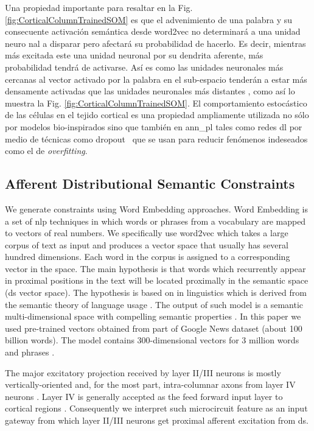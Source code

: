 {Una propiedad importante para resaltar en la Fig. \ref{fig:CorticalColumnTrainedSOM} es que el advenimiento de una palabra y su consecuente activación semántica desde word2vec no determinará a una unidad neuro nal a disparar pero afectará su probabilidad de hacerlo.
Es decir, mientras más excitada este una unidad neuronal por su dendrita aferente, más probabilidad tendrá de activarse.
Así es como las unidades neuronales más cercanas al vector activado por la palabra en el sub-espacio tenderán a estar más densamente activadas que las unidades neuronales más distantes , como así lo muestra la Fig. \ref{fig:CorticalColumnTrainedSOM}.
El comportamiento estocástico de las células en el tejido cortical es una propiedad ampliamente utilizada no sólo por modelos bio-inspirados \cite{harrison_l.m_stochastic_2005} sino que también en \gls{ann_pl} tales como redes \gls{dl} por medio de técnicas como dropout~\cite{Srivastava2014DropoutAS} que se usan para reducir fenómenos indeseados como el de \emph{overfitting}.
}{
\subsection{Afferent Distributional Semantic Constraints}

We generate  constraints using Word Embedding approaches. Word Embedding is a set of \gls{nlp} techniques in which words or phrases from a vocabulary are mapped to vectors of real numbers. We specifically use word2vec which takes a large corpus of text as input and produces a vector space that usually has several hundred dimensions. Each word in the corpus is assigned to a corresponding vector in the space. The main hypothesis is that words which recurrently appear in proximal positions in the text will be located proximally in the semantic space (\gls{ds} vector space).
The hypothesis is based on  in linguistics which is derived from the semantic theory of language usage \cite{doi:10.1080/00437956.1954.11659520}.
The output of such model is a semantic multi-dimensional space with compelling semantic properties \cite{mikolov2013linguistic, journals/corr/abs-1301-3781, Mikolov:2013:DRW:2999792.2999959}. In this paper we used pre-trained vectors obtained from part of Google News dataset (about 100 billion words). The model contains 300-dimensional vectors for 3 million words and phrases \cite{noauthor_google_nodate}.

The major excitatory projection received by layer II/III neurons is mostly vertically-oriented and, for the most part, intra-columnar axons
from layer IV neurons \cite{10.3389/neuro.01.1.1.002.2007,Lbke2007ExcitatorySF}.
Layer IV is generally accepted as the feed forward input layer to cortical regions \cite{doi:10.1177/1073858407305201}.
Consequently we interpret such microcircuit feature as an input gateway from which layer II/III neurons get proximal afferent excitation from \gls{ds}.

}
